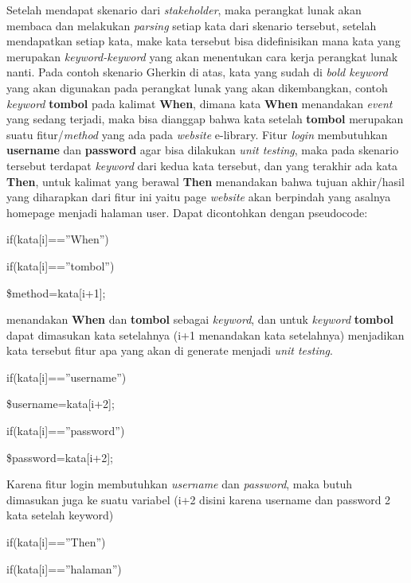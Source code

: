 \documentclass[a4paper,twoside]{article}
\begin{document}
\begin{enumerate}
Setelah mendapat skenario dari \textit{stakeholder}, maka perangkat lunak akan membaca dan melakukan \textit{parsing} setiap kata dari skenario tersebut, setelah mendapatkan setiap kata, make kata tersebut bisa didefinisikan mana kata yang merupakan \textit{keyword-keyword} yang akan menentukan cara kerja perangkat lunak nanti. Pada contoh skenario Gherkin di atas, kata yang sudah di \textit{bold keyword} yang akan digunakan pada perangkat lunak yang akan dikembangkan, contoh \textit{keyword} \textbf{tombol} pada kalimat \textbf{When}, dimana kata \textbf{When} menandakan \textit{event} yang sedang terjadi, maka bisa dianggap bahwa kata setelah \textbf{tombol} merupakan suatu fitur/\textit{method} yang ada pada \textit{website} e-library. Fitur \textit{login} membutuhkan \textbf{username} dan \textbf{password} agar bisa dilakukan \textit{unit testing}, maka pada skenario tersebut terdapat \textit{keyword} dari kedua kata tersebut, dan yang terakhir ada kata \textbf{Then}, untuk kalimat yang berawal \textbf{Then} menandakan bahwa tujuan akhir/hasil yang diharapkan dari fitur ini yaitu page \textit{website} akan berpindah yang asalnya homepage menjadi halaman user. Dapat dicontohkan dengan pseudocode:

if(kata[i]==”When”)

\hspace{5mm}if(kata[i]==”tombol”)

\hspace{10mm}\$method=kata[i+1];

menandakan \textbf{When} dan \textbf{tombol} sebagai \textit{keyword}, dan untuk \textit{keyword} \textbf{tombol} dapat dimasukan kata setelahnya (i+1 menandakan kata setelahnya) menjadikan kata tersebut fitur apa yang akan di generate menjadi \textit{unit testing}. 

if(kata[i]==”username”)

\hspace{5mm}	\$username=kata[i+2]; 

if(kata[i]==”password”)

\hspace{5mm}	\$password=kata[i+2]; 

Karena fitur login membutuhkan \textit{username} dan \textit{password}, maka butuh dimasukan juga ke suatu variabel (i+2 disini karena username dan password 2 kata setelah keyword) 

if(kata[i]==”Then”)

\hspace{5mm}	if(kata[i]==”halaman”)
	

\end{enumerate}
\end{document}
